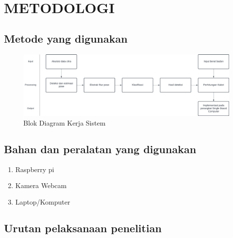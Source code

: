 \section{METODOLOGI}


\subsection{Metode yang digunakan}

\begin{figure} [ht] \centering
  \includegraphics[scale=0.9]{gambar/blok diagram metodologi.png}
  \caption{Blok Diagram Kerja Sistem}
  \label{fig:BlokDiagram}
\end{figure}

\subsection{Bahan dan peralatan yang digunakan}

\begin{enumerate}
  \item Raspberry pi
  \item Kamera Webcam
  \item Laptop/Komputer
\end{enumerate}

\subsection{Urutan pelaksanaan penelitian}

